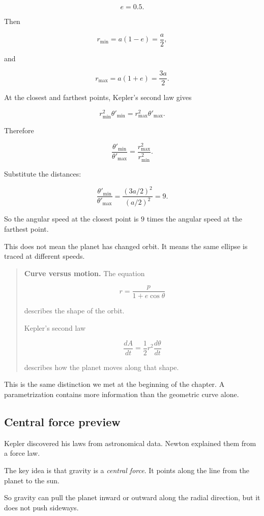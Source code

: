 \[
e=0.5.
\]

Then

\[
r_{\min}=a(1-e)=\frac{a}{2},
\]

and

\[
r_{\max}=a(1+e)=\frac{3a}{2}.
\]

At the closest and farthest points, Kepler's second law gives

\[
r_{\min}^2\theta'_{\min}=r_{\max}^2\theta'_{\max}.
\]

Therefore

\[
\frac{\theta'_{\min}}{\theta'_{\max}}
=
\frac{r_{\max}^2}{r_{\min}^2}.
\]

Substitute the distances:

\[
\frac{\theta'_{\min}}{\theta'_{\max}}
=
\frac{(3a/2)^2}{(a/2)^2}
=
9.
\]

So the angular speed at the closest point is \(9\) times the angular speed at the farthest
point.

This does not mean the planet has changed orbit.  It means the same ellipse is traced at
different speeds.

\begin{quote}
\textbf{Curve versus motion.}
The equation

\[
r=\frac{p}{1+e\cos\theta}
\]

describes the shape of the orbit.

Kepler's second law

\[
\frac{dA}{dt}=\frac12 r^2\frac{d\theta}{dt}
\]

describes how the planet moves along that shape.
\end{quote}

This is the same distinction we met at the beginning of the chapter.  A parametrization
contains more information than the geometric curve alone.

\subsection{Central force preview}
\label{subsec:central-force-preview}

Kepler discovered his laws from astronomical data.  Newton explained them from a force
law.

The key idea is that gravity is a \emph{central force}.  It points along the line from the
planet to the sun.

So gravity can pull the planet inward or outward along the radial direction, but it does
not push sideways.

